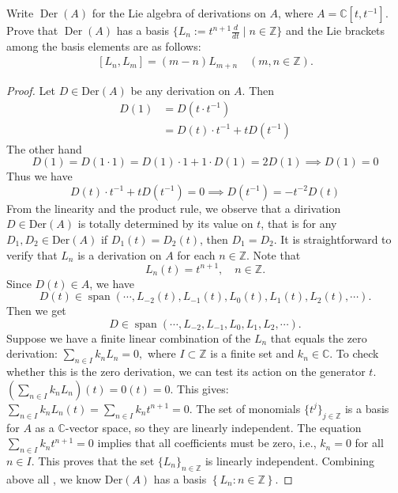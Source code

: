 \documentclass[../main.tex]{subfiles}
\begin{document}
\begin{exercise}{}{}
Write $\operatorname{Der}(A)$ for the Lie algebra of derivations on $A$, where $A = \mathbb{C}[t, t^{-1}]$. Prove that $\operatorname{Der}(A)$ has a basis $\{L_n := t^{n+1} \frac{d}{dt} \mid n \in \mathbb{Z}\}$ and the Lie brackets among the basis elements are as follows:
\[\begin{aligned}
[L_n, L_m] = (m-n)L_{m+n} \quad (m,n \in \mathbb{Z}).
\end{aligned}\]
\end{exercise}

\begin{proof}
 
     Let \(  D\in \mathrm{Der}\left( A \right)   \) be any derivation on \(  A  \). Then \[
    \begin{aligned}
     D\left( 1  \right)&= D\left( t\cdot t^{-1}  \right) \\ 
      &=  D\left( t \right)\cdot t^{-1} + tD\left( t^{-1}  \right)   
    \end{aligned}  
     \]  The other hand \[
     D\left( 1 \right)= D\left( 1\cdot 1 \right)=  D\left( 1 \right)\cdot 1+ 1\cdot D\left( 1 \right)= 2D\left( 1 \right)   \implies D\left( 1 \right)= 0  
     \] Thus we have \[
     D\left( t \right)\cdot  t^{-1} + tD\left( t^{-1}  \right)= 0  \implies D\left( t^{-1}  \right)=  -t ^{-2}D\left( t \right) 
     \] From the linearity and the product rule, we observe that a dirivation \(  D \in \mathrm{Der}\left( A \right)   \) is totally determined by its value on  \(  t  \), that is  for any \(  D_1,D_2 \in \mathrm{Der}\left( A \right)   \) if \(  D_1\left( t \right)= D_2\left( t \right)    \), then \(  D_1= D_2  \).    It is straightforward to verify that  \(  L_{n}  \) is a derivation on \(  A  \) for each \(  n \in \mathbb{Z}   \). Note that \[
     L_{n}\left( t \right)=  t^{n+ 1} ,\quad  n\in \mathbb{Z} .
     \]   Since \(  D\left( t \right) \in A   \), we have  \[
     D\left( t \right)\in \operatorname{span}\left(\cdots ,L_{-2}\left( t \right),L_{-1}\left( t \right),L_0\left( t \right),L_1\left( t \right),L_2\left( t \right),\cdots       \right)  .
     \] Then we get \[
     D\in \operatorname{span}\left( \cdots ,L_{-2},L_{-1},L_{0},L_{1},L_{2},\cdots  \right) .
     \] Suppose we have a finite linear combination of the $L_n$ that equals the zero derivation:
$\sum_{n \in I} k_n L_n = 0,$
where $I \subset \mathbb{Z}$ is a finite set and $k_n \in \mathbb{C}$.
To check whether this is the zero derivation, we can test its action on the generator $t$.
$\left(\sum_{n \in I} k_n L_n\right)(t) = 0(t) = 0.$
This gives:
$\sum_{n \in I} k_n L_n(t) = \sum_{n \in I} k_n t^{n+1} = 0.$
The set of monomials $\{t^j\}_{j \in \mathbb{Z}}$ is a basis for $A$ as a $\mathbb{C}$-vector space, so they are linearly independent. The equation $\sum_{n \in I} k_n t^{n+1} = 0$ implies that all coefficients must be zero, i.e., $k_n = 0$ for all $n \in I$.
This proves that the set $\{L_n\}_{n \in \mathbb{Z}}$ is linearly independent. Combining above all , we know \(  \mathrm{Der}\left( A \right)   \) has a basis \(  \left\{ L_{n}:n\in \mathbb{Z}  \right\}  \).      


\end{proof}
\end{document}
